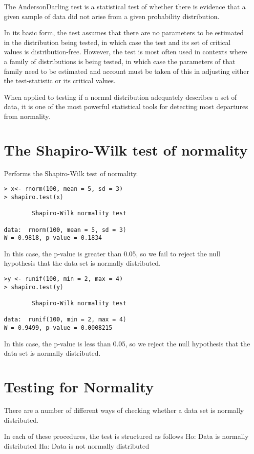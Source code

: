 The AndersonDarling test is a statistical test of whether there is evidence that a given sample of data did not arise from a given probability distribution.

In its basic form, the test assumes that there are no parameters to be estimated in the distribution being tested, in which case the test and its set of critical values is distribution-free. However, the test is most often used in contexts where a family of distributions is being tested, in which case the parameters of that family need to be estimated and account must be taken of this in adjusting either the test-statistic or its critical values.

When applied to testing if a normal distribution adequately describes a set of data, it is one of the most powerful statistical tools for detecting most departures from normality.

\section{The Shapiro-Wilk test of normality}
Performs the Shapiro-Wilk test of normality.
\begin{verbatim}
> x<- rnorm(100, mean = 5, sd = 3)
> shapiro.test(x)

        Shapiro-Wilk normality test

data:  rnorm(100, mean = 5, sd = 3)
W = 0.9818, p-value = 0.1834
\end{verbatim}
In this case, the p-value is greater than 0.05, so we fail to reject the null hypothesis that the
data set is normally distributed.
\begin{verbatim}
>y <- runif(100, min = 2, max = 4)
> shapiro.test(y)

        Shapiro-Wilk normality test

data:  runif(100, min = 2, max = 4)
W = 0.9499, p-value = 0.0008215
\end{verbatim}
In this case, the p-value is less than 0.05, so we reject the null hypothesis that the
data set is normally distributed.
\section{Testing for Normality}

There are a number of different ways of checking whether a data set is normally distributed. 

In each of these procedures, the test is structured as follows
	Ho: Data is normally distributed
	Ha: Data is not normally distributed

